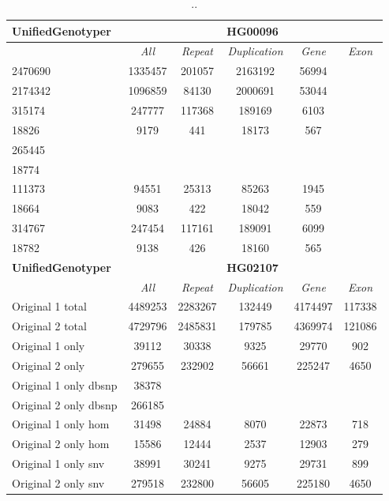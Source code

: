 \begin{table}[htb]
\begin{center}
\begin{tabular}{|l|c||c|c|c|c|}
\hline
{\bf UnifiedGenotyper} & \multicolumn{5}{|c|}{\bf HG00096} \\
\hline
\cline{2-6}
{\bf} & {\it All} & {\it Repeat} & {\it Duplication} & {\it Gene} & {\it Exon} \\
\hline
2470690 & 1335457 & 201057 & 2163192 & 56994\\ 
\hline
2174342 & 1096859 & 84130 & 2000691 & 53044\\ 
\hline
315174 & 247777 & 117368 & 189169 & 6103\\ 
\hline
18826 & 9179 & 441 & 18173 & 567\\ 
\hline
265445 &  &  &  & \\ 
\hline
18774 &  &  &  & \\ 
\hline
111373 & 94551 & 25313 & 85263 & 1945\\ 
\hline
18664 & 9083 & 422 & 18042 & 559\\ 
\hline
314767 & 247454 & 117161 & 189091 & 6099\\ 
\hline
18782 & 9138 & 426 & 18160 & 565\\ 
\hline
\hline
{\bf UnifiedGenotyper} & \multicolumn{5}{|c|}{\bf HG02107} \\
\hline
\cline{2-6}
{\bf} & {\it All} & {\it Repeat} & {\it Duplication} & {\it Gene} & {\it Exon} \\
\hline
Original 1 total & 4489253 & 2283267 & 132449 & 4174497 & 117338\\ 
\hline
Original 2 total & 4729796 & 2485831 & 179785 & 4369974 & 121086\\ 
\hline
Original 1 only & 39112 & 30338 & 9325 & 29770 & 902\\ 
\hline
Original 2 only & 279655 & 232902 & 56661 & 225247 & 4650\\ 
\hline
Original 1 only dbsnp & 38378 &  &  &  & \\ 
\hline
Original 2 only dbsnp & 266185 &  &  &  & \\ 
\hline
Original 1 only hom & 31498 & 24884 & 8070 & 22873 & 718\\ 
\hline
Original 2 only hom & 15586 & 12444 & 2537 & 12903 & 279\\ 
\hline
Original 1 only snv & 38991 & 30241 & 9275 & 29731 & 899\\ 
\hline
Original 2 only snv & 279518 & 232800 & 56605 & 225180 & 4650\\ 
\hline
\end{tabular}
\end{center}
\caption{ .. }
\label{tab:orig-vs-shuf-ug}
\end{table}

